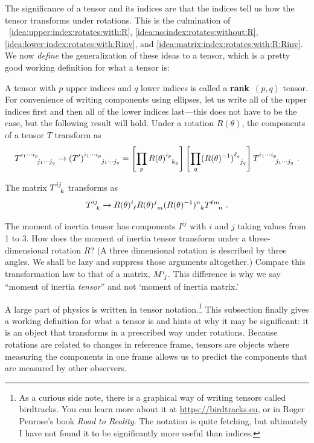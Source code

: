 \documentclass[12pt]{article}
\begin{document}
The significance of a tensor and its indices are that the indices tell us how the tensor transforms under rotations. This is the culmination of \bigidearefs~\ref{idea:upper:index:rotates:with:R}, \ref{idea:no:index:rotates:without:R}, \ref{idea:lower:index:rotates:with:Rinv}, and \ref{idea:matrix:index:rotates:with:R:Rinv}. We now \emph{define} the generalization of these ideas to a tensor, which is a pretty good working definition for what a tensor is:
\begin{bigidea}\label{idea:tensor:rotation}
A tensor with $p$ upper indices and $q$ lower indices is called a \textbf{rank}~$(p,q)$ tensor. For convenience of writing components using ellipses, let us write all of the upper indices first and then all of the lower indices last---this does not have to be the case, but the following result will hold. Under a rotation $R(\theta)$, the components of a tensor $T$ transform as
\begin{align}
    T^{i_1\cdots i_p}_{\phantom{i_1\cdots i_p}j_1\cdots j_q} \to 
    (T')^{i_1\cdots i_p}_{\phantom{i_1\cdots i_p}j_1\cdots j_q}
    = 
    \left[\prod_{p}
            R(\theta)\aij{i_p}{k_p}\right]
    \left[\prod_{q}
            (R(\theta)\inv)\aij{\ell_q}{j_q}\right]
    T^{i_1\cdots i_p}_{\phantom{i_1\cdots i_p}j_1\cdots j_q}  \ .
\end{align}
\end{bigidea}
\begin{example}
The matrix $T\aij{ij}{k}$ transforms as
\begin{align}
    T\aij{ij}{k} \to 
    R(\theta)\aij{i}{\ell}
    R(\theta)\aij{j}{m}
    (R(\theta)\inv)\aij{n}{k}
    T\aij{\ell m}{n} \ .
\end{align}
\end{example}

\begin{exercise}
The moment of inertia tensor has components $I^{ij}$ with $i$ and $j$ taking values from 1 to 3. How does the moment of inertia tensor transform under a three-dimensional rotation $R$? (A three dimensional rotation is described by three angles. We shall be lazy and suppress those arguments altogether.) Compare this transformation law to that of a matrix, $M\aij{i}{j}$. This difference is why we say ``moment of inertia \emph{tensor}'' and not `moment of inertia matrix.'
\end{exercise}

A large part of physics is written in tensor notation.\footnote{As a curious side note, there is a graphical way of writing tensors called birdtracks. You can learn more about it at \url{https://birdtracks.eu}, or in Roger Penrose's book \emph{Road to Reality}. The notation is quite fetching, but ultimately I have not found it to be significantly more useful than indices.} This subsection finally gives a working definition for what a tensor is and hints at why it may be significant: it is an object that transforms in a prescribed way under rotations. Because rotations are related to changes in reference frame, tensors are objects where measuring the components in one frame allows us to predict the components that are measured by other observers. 
\end{document}
